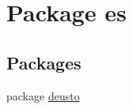 \hypertarget{namespacees}{}\section{Package es}
\label{namespacees}
\subsection*{Packages}
\begin{DoxyCompactItemize}
\item 
package \hyperlink{namespacees_1_1deusto}{deusto}
\end{DoxyCompactItemize}
